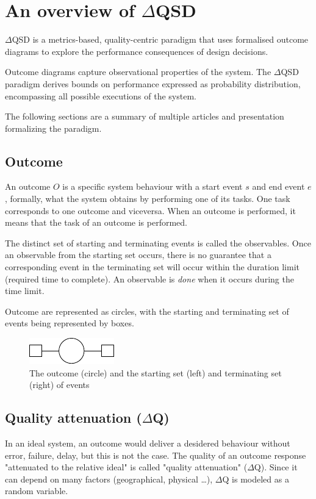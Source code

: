 \section{An overview of $\Delta$QSD}
    $\Delta$QSD is a metrics-based, quality-centric paradigm that uses formalised outcome diagrams to explore the performance consequences of design decisions.

    Outcome diagrams capture observational properties of the system. The $\Delta$QSD paradigm derives bounds on performance expressed as probability distribution, encompassing all possible executions of the system. 
 
    The following sections are a summary of multiple articles and presentation formalizing the paradigm.
 
 \subsection{Outcome}
        An outcome $O$ is a specific system behaviour with a start event $s$ and end event $e$, formally, what the system obtains by performing one of its tasks. One task corresponds to one outcome and viceversa. When an outcome is performed, it means that the task of an outcome is performed.

    The distinct set of starting and terminating events is called the observables. Once an observable from the starting set occurs, there is no guarantee that a corresponding event in the terminating set will occur within the duration limit (required time to complete). An observable is \textit{done}  when it occurs during the time limit.
    
    Outcome are represented as circles, with the starting and terminating set of events being represented by boxes.
    \begin{figure}[H]
        \begin{center}
            \includegraphics[scale=1.3]{tikz/outcome.pdf}
        \end{center}
        \caption{The outcome (circle) and the starting set (left) and terminating set (right) of events}
    \end{figure}

\subsection{Quality attenuation ($\Delta$Q)}
        In an ideal system, an outcome would deliver a desidered behaviour without error, failure, delay, but this is not the case. The quality of an outcome response "attenuated to the relative ideal" is called "quality attenuation" ($\Delta$Q). Since it can depend on many factors (geographical, physical \dots), $\Delta$Q is modeled as a random variable.

